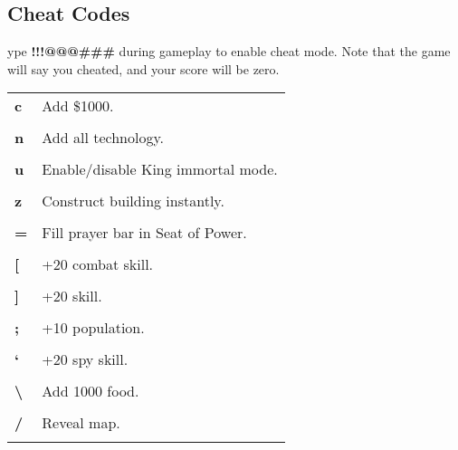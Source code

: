 \subsection{\textsf{Cheat Codes}}



ype \textbf{!!!@@@\#\#\#} during gameplay to enable cheat mode. Note that the game will say you cheated, and your score will be zero.

\begin{tabular}{p{1in} p{3in}}    
    \textbf{c} & Add \$1000. \\ \\        
    \textbf{n} & Add all technology.\\ \\        
    \textbf{u} & Enable/disable King immortal mode.\\ \\        
    \textbf{z} & Construct building instantly.\\ \\        
    \textbf{=} & Fill prayer bar in Seat of Power.\\ \\        
    \textbf{[} & +20 combat skill.\\ \\        
    \textbf{]} & +20 skill.\\ \\        
    \textbf{;} & +10 population.\\ \\        
    \textbf{‘} & +20 spy skill.\\ \\        
    \textbf{\textbackslash} & Add 1000 food.\\ \\        
    \textbf{/} & Reveal map.\\ \\
\end{tabular}